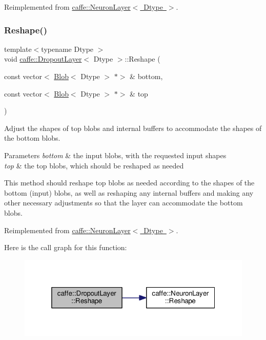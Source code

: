 Reimplemented from \mbox{\hyperlink{classcaffe_1_1_neuron_layer_a6d0facf4a5e6f459cf1cb8b28d945790}{caffe\+::\+Neuron\+Layer$<$ Dtype $>$}}.

\mbox{\label{classcaffe_1_1_dropout_layer_a8ddbd583b7430f228506954910935505}} 
\subsubsection{\texorpdfstring{Reshape()}{Reshape()}\hspace{0.1cm}{\footnotesize\ttfamily [2/2]}}
{\footnotesize\ttfamily template$<$typename Dtype $>$ \\
void \mbox{\hyperlink{classcaffe_1_1_dropout_layer}{caffe\+::\+Dropout\+Layer}}$<$ Dtype $>$\+::Reshape (\begin{DoxyParamCaption}\item[{const vector$<$ \mbox{\hyperlink{classcaffe_1_1_blob}{Blob}}$<$ Dtype $>$ $\ast$$>$ \&}]{bottom,  }\item[{const vector$<$ \mbox{\hyperlink{classcaffe_1_1_blob}{Blob}}$<$ Dtype $>$ $\ast$$>$ \&}]{top }\end{DoxyParamCaption})\hspace{0.3cm}{\ttfamily [virtual]}}



Adjust the shapes of top blobs and internal buffers to accommodate the shapes of the bottom blobs. 


\begin{DoxyParams}{Parameters}
{\em bottom} & the input blobs, with the requested input shapes \\
\hline
{\em top} & the top blobs, which should be reshaped as needed\\
\hline
\end{DoxyParams}
This method should reshape top blobs as needed according to the shapes of the bottom (input) blobs, as well as reshaping any internal buffers and making any other necessary adjustments so that the layer can accommodate the bottom blobs. 

Reimplemented from \mbox{\hyperlink{classcaffe_1_1_neuron_layer_a6d0facf4a5e6f459cf1cb8b28d945790}{caffe\+::\+Neuron\+Layer$<$ Dtype $>$}}.

Here is the call graph for this function\+:
\nopagebreak
\begin{figure}[H]
\begin{center}
\leavevmode
\includegraphics[width=319pt]{classcaffe_1_1_dropout_layer_a8ddbd583b7430f228506954910935505_cgraph}
\end{center}
\end{figure}


